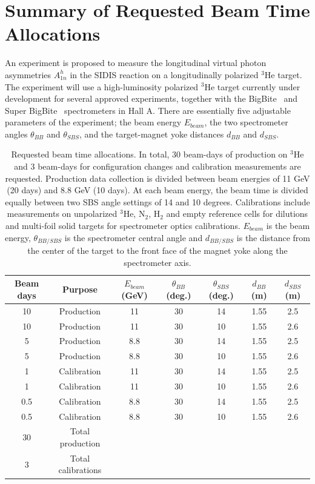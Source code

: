 \section{Summary of Requested Beam Time Allocations}
An experiment is proposed to measure the longitudinal virtual photon asymmetries $A_{1n}^{h}$ in the SIDIS reaction on a longitudinally polarized $^3$He target. The experiment will use a high-luminosity polarized $^3$He target currently under development for several approved experiments, together with the BigBite~\cite{BigBiteOptics1998,BigBite1998,BigBiteOptics2012} and Super BigBite~\cite{SBS_CDR,SBS_CDR_NEW} spectrometers in Hall A. There are essentially five adjustable parameters of the experiment; the beam energy $E_{beam}$, the two spectrometer angles $\theta_{BB}$ and $\theta_{SBS}$, and the target-magnet yoke distances $d_{BB}$ and $d_{SBS}$.
\begin{table}[h]
  \begin{center}
    \caption{\label{Kintable} Requested beam time allocations. In total, 30 beam-days of production on $^3$He and 3 beam-days for configuration changes and calibration measurements are requested. Production data collection is divided between beam energies of 11 GeV (20 days) and 8.8 GeV (10 days). At each beam energy, the beam time is divided equally between two SBS angle settings of 14 and 10 degrees. Calibrations include measurements on unpolarized $^3$He, N$_2$, H$_2$ and empty reference cells for dilutions and multi-foil solid targets for spectrometer optics calibrations. $E_{beam}$ is the beam energy, $\theta_{BB/SBS}$ is the spectrometer central angle and $d_{BB/SBS}$ is the distance from the center of the target to the front face of the magnet yoke along the spectrometer axis.}
    \begin{tabular}{ccccccc}
      \hline \hline Beam days & Purpose & $E_{beam}$ (GeV) & $\theta_{BB}$ (deg.) & $\theta_{SBS}$ (deg.) & $d_{BB}$ (m) & $d_{SBS}$ (m)  \\ \hline 
      10 & Production & 11 & 30 & 14 & 1.55 & 2.5 \\ 
      10 & Production & 11 & 30 & 10 & 1.55 & 2.6 \\
      5 & Production & 8.8 & 30 & 14 & 1.55 & 2.5  \\ 
      5 & Production & 8.8 & 30 & 10 & 1.55 & 2.6  \\
      1 & Calibration & 11 & 30 & 14 & 1.55 & 2.5  \\
      1 & Calibration & 11 & 30 & 10 & 1.55 & 2.6 \\
      0.5 & Calibration & 8.8 & 30 & 14 & 1.55 & 2.5 \\ 
      0.5 & Calibration & 8.8 & 30 & 10 & 1.55 & 2.6  \\ \hline 
      30 & Total production & & & & &  \\ 
      3 & Total calibrations & & & & &  \\ \hline \hline
    \end{tabular}
  \end{center}
\end{table}
